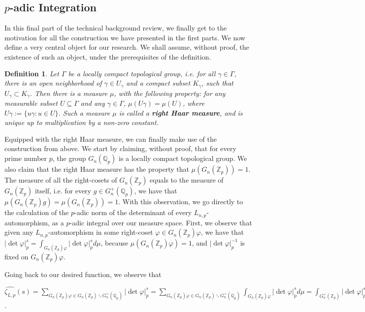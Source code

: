 \documentclass[12pt]{article}
\newtheorem{definition}[theorem]{Definition}
\begin{document}
\subsection{$p$-adic Integration}
In this final part of the technical background review, we finally get to the motivation for all the construction we have presented in the first parts. We now define a very central object for our research. We shall assume, without proof, the existence of such an object, under the prerequisites of the definition.
\begin{definition}
\label{def.right.haar.measure}
Let $\Gamma$ be a locally compact topological group, i.e. for all $\gamma\in\Gamma$, there is an open neighborhood of $\gamma\in U_{\gamma}$ and a compact subset $K_{\gamma}$, such that $U_{\gamma}\subset K_{\gamma}$. Then there is a measure $\mu$, with the following property: for any measurable subset $U\subseteq\Gamma$ and any $\gamma\in\Gamma$, $\mu(U\gamma)=\mu(U)$, where $U\gamma:=\{u\gamma : u\in U\}$. Such a measure $\mu$ is called a \textbf{right Haar measure}, and is unique up to multiplication by a non-zero constant.
\end{definition}
Equipped with the right Haar measure, we can finally make use of the construction from above. We start by claiming, without proof, that for every prime number $p$, the group $G_n(\mathbb{Q}_p)$ is a locally compact topological group. We also claim that the right Haar measure has the property that $\mu(G_n(\mathbb{Z}_p))=1$. The measure of all the right-cosets of $G_n(\mathbb{Z}_p)$ equals to the measure of $G_n(\mathbb{Z}_p)$ itself, i.e. for every $g\in G^+_n(\mathbb{Q}_p)$, we have that $\mu(G_n(\mathbb{Z}_p)g)=\mu(G_n(\mathbb{Z}_p))=1$.
With this observation, we go directly to the calculation of the $p$-adic norm of the determinant of every $L_{n,p}$-automorphism, as a $p$-adic integral over our measure space.
First, we observe that given any $L_{n,p}$-automorphism in some right-coset $\varphi\in G_n(\mathbb{Z}_p)\varphi$, we have that $|\det\varphi|_p^s=\displaystyle\int_{G_n(\mathbb{Z}_p)\varphi}|\det\varphi|_p^sd\mu$, because $\mu(G_n(\mathbb{Z}_p)\varphi)=1$, and $|\det\varphi|_p^{-1}$ is fixed on $G_n(\mathbb{Z}_p)\varphi$.\par
Going back to our desired function, we observe that\par $\hat{\zeta_{L,p}}(s)=\underset{\scriptscriptstyle G_n(\mathbb{Z}_p)\varphi\in G_n(\mathbb{Z}_p)\backslash G^+_n(\mathbb{Q}_p)}{\sum}|\det\varphi|_p^s=\underset{\scriptscriptstyle G_n(\mathbb{Z}_p)\varphi\in G_n(\mathbb{Z}_p)\backslash G^+_n(\mathbb{Q}_p)}{\sum}\displaystyle\int_{G_n(\mathbb{Z}_p)\varphi}|\det\varphi|_p^sd\mu=\displaystyle\int_{G^+_n(\mathbb{Z}_p)}|\det\varphi|_p^sd\mu$.\par 
\end{document}
